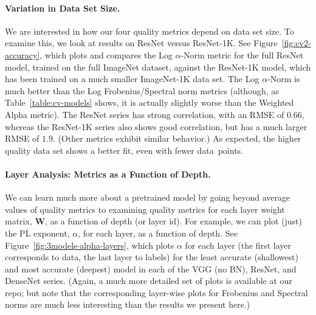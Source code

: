 \paragraph{Variation in Data Set Size.}

We are interested in how our four quality metrics depend on data set size.
To examine this, we look at results on ResNet versus ResNet-1K.
See Figure~\ref{fig:cv2-accuracy}, which plots and compares the Log $\alpha$-Norm metric 
for the full ResNet model, trained on the full ImageNet dataset, against the ResNet-1K model, which has been trained on a much smaller ImageNet-1K data set.
The Log $\alpha$-Norm is much better than the Log Frobenius/Spectral norm metrics (although, as Table~\ref{table:cv-models} shows, it is actually slightly worse than the Weighted Alpha metric).
The ResNet series has strong correlation, with an RMSE of $0.66$, whereas the ResNet-1K series also shows good correlation, but has a much larger RMSE of $1.9$.
(Other metrics exhibit similar behavior.)
As expected, the higher quality data set shows a better fit, even with fewer data~points.


\paragraph{Layer Analysis: Metrics as a Function of Depth.}

We can learn much more about a pretrained model by going beyond average values of quality metrics to examining quality metrics for each layer weight matrix, $\mathbf{W}$, as a function of depth (or layer id).  %
For example, we can 
plot (just) the PL exponent, $\alpha$, for each layer, %
as a function of depth.
%
See Figure~\ref{fig:3models-alpha-layers}, which plots $\alpha$ for each layer (the first layer corresponds to data, the last layer to labels) for the least accurate (shallowest) and most accurate (deepest) model in each of the VGG (no BN), ResNet, and DenseNet series.
(Again, a much more detailed set of plots is available at our repo; but note that the corresponding layer-wise plots for Frobenius and Spectral norms are much less interesting than the results we present here.)

